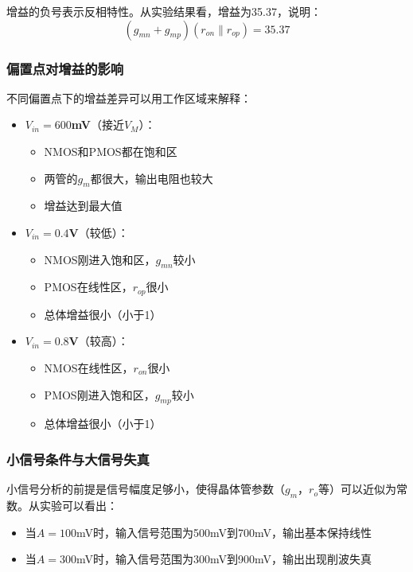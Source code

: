 \documentclass[UTF8,12pt,a4paper]{ctexart}
\begin{document}
增益的负号表示反相特性。从实验结果看，增益为35.37，说明：
\begin{equation}
(g_{mn} + g_{mp})(r_{on} \| r_{op}) = 35.37
\end{equation}

\subsubsection{偏置点对增益的影响}
不同偏置点下的增益差异可以用工作区域来解释：

\begin{itemize}
\item \textbf{$V_{in} = 600$mV}（接近$V_M$）：
  \begin{itemize}
  \item NMOS和PMOS都在饱和区
  \item 两管的$g_m$都很大，输出电阻也较大
  \item 增益达到最大值
  \end{itemize}

\item \textbf{$V_{in} = 0.4$V}（较低）：
  \begin{itemize}
  \item NMOS刚进入饱和区，$g_{mn}$较小
  \item PMOS在线性区，$r_{op}$很小
  \item 总体增益很小（小于1）
  \end{itemize}

\item \textbf{$V_{in} = 0.8$V}（较高）：
  \begin{itemize}
  \item NMOS在线性区，$r_{on}$很小
  \item PMOS刚进入饱和区，$g_{mp}$较小
  \item 总体增益很小（小于1）
  \end{itemize}
\end{itemize}

\subsubsection{小信号条件与大信号失真}
小信号分析的前提是信号幅度足够小，使得晶体管参数（$g_m$，$r_o$等）可以近似为常数。从实验可以看出：
\begin{itemize}
\item 当$A = 100$mV时，输入信号范围为500mV到700mV，输出基本保持线性
\item 当$A = 300$mV时，输入信号范围为300mV到900mV，输出出现削波失真
\end{itemize}
\end{document}
